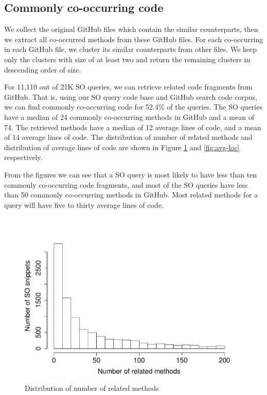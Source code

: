 \subsection{Commonly co-occurring code}

We collect the original GitHub files which contain the similar counterparts, then we extract all co-occurred methods from these GitHub files. For each co-occurring in each GitHub file, we cluster its similar counterparts from other files. We keep only the clusters with size of at least two and return the remaining clusters in descending order of size.

For 11,110 out of 21K SO queries, we can retrieve related code fragments from GitHub. That is, using our SO query code base and GitHub search code corpus, we can find commonly co-occurring code for 52.4\% of the queries. The SO queries have a median of 24 commonly co-occurring methods in GitHub and a mean of 74. The retrieved methods have a median of 12 average lines of code, and a mean of 14 average lines of code. The distribution of number of related methods and distribution of average lines of code are shown in Figure \ref{fig:num-related} and \ref{fig:avg-loc} respectively.

From the figures we can see that a SO query is most likely to have less than ten commonly co-occurring code fragments, and most of the SO queries have less than 50 commonly co-occurring methods in GitHub. Most related methods for a query will have five to thirty average lines of code.

\begin{figure}
	\includegraphics[scale=0.4]{figures/dist-related.pdf}
	\caption{Distribution of number of related methods}
	\label{fig:num-related}
\end{figure}

